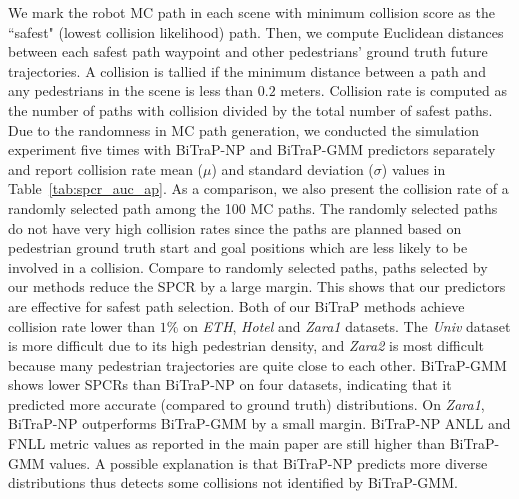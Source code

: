 \documentclass[letterpaper, 10 pt, conference]{ieeeconf}
\begin{document}
 We mark the robot MC path in each scene with minimum collision score as the ``safest" (lowest collision likelihood) path. Then, we compute Euclidean distances between each safest path waypoint and other pedestrians' ground truth future trajectories. A collision is tallied if the minimum distance between a path and any pedestrians in the scene is less than $0.2$ meters. Collision rate is computed as the number of paths with collision divided by the total number of safest paths. Due to the randomness in MC path generation, we conducted the simulation experiment five times with BiTraP-NP and BiTraP-GMM predictors separately and report collision rate mean ($\mu$) and standard deviation ($\sigma$) values in Table~\ref{tab:spcr_auc_ap}. As a comparison, we also present the collision rate of a randomly selected path among the 100 MC paths. The randomly selected paths do not have very high collision rates since the paths are planned based on pedestrian ground truth start and goal positions which are less likely to be involved in a collision. Compare to randomly selected paths, paths selected by our methods reduce the SPCR by a large margin. This shows that our predictors are effective for safest path selection. Both of our BiTraP methods achieve collision rate lower than $1\%$ on \textit{ETH}, \textit{Hotel} and \textit{Zara1} datasets. The \textit{Univ} dataset is more difficult due to its high pedestrian density, and \textit{Zara2} is most difficult because many pedestrian trajectories are quite close to each other. 
BiTraP-GMM shows lower SPCRs than BiTraP-NP on four datasets, indicating that it predicted more accurate (compared to ground truth) distributions. On \textit{Zara1}, BiTraP-NP outperforms BiTraP-GMM by a small margin. BiTraP-NP ANLL and FNLL metric values as reported in the main paper are still higher than BiTraP-GMM values. A possible explanation is that BiTraP-NP predicts more diverse distributions thus detects some collisions not identified by BiTraP-GMM.
\end{document}

